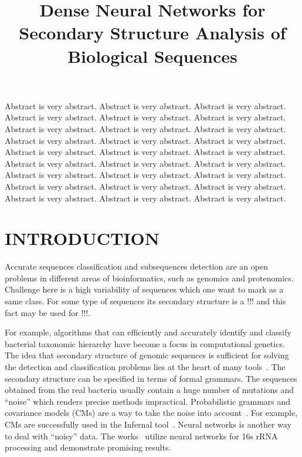 \documentclass[a4paper,twoside]{article}
\begin{document}
\title{Dense Neural Networks for Secondary Structure Analysis of Biological Sequences}

\author{
}


\abstract
{
Abstract is very abstract. Abstract is very abstract. Abstract is very abstract.
Abstract is very abstract. Abstract is very abstract. Abstract is very abstract.
Abstract is very abstract. Abstract is very abstract. Abstract is very abstract.
Abstract is very abstract. Abstract is very abstract. Abstract is very abstract.
Abstract is very abstract. Abstract is very abstract. Abstract is very abstract.
Abstract is very abstract. Abstract is very abstract. Abstract is very abstract.
Abstract is very abstract. Abstract is very abstract. Abstract is very abstract.
Abstract is very abstract. Abstract is very abstract. Abstract is very abstract.
Abstract is very abstract. Abstract is very abstract. Abstract is very abstract.
}

\onecolumn \maketitle \normalsize \vfill

\section{\uppercase{Introduction}}
\label{sec:introduction}

\noindent Accurate sequences classification and subsequences detection are an open problems in different areas of bioinformatics, such as genomics and protenomics. 
Challenge here is a high variability of sequences which one want to mark as a same class.
For some type of sequences its secondary structure is a !!! and this fact may be used for !!!.

For example, algorithms that can efficiently and accurately identify and classify bacterial taxonomic hierarchy have become a focus in computational genetics.
The idea that secondary structure of genomic sequences is sufficient for solving the detection and classification problems lies at the heart of many tools~\cite{GrammarsRNA,PCFG,meta,LWPCFG}. 
The secondary structure can be specified in terms of formal grammars. 
The sequences obtained from the real bacteria usually contain a huge number of mutations and ``noise'' which renders precise methods impractical. 
Probabilistic grammars and covariance models (CMs) are a way to take the noise into account~\cite{EddyDurbin}.
For example, CMs are successfully used in the Infernal tool~\cite{Infernal}.
Neural networks is another way to deal with ``noisy'' data. 
The works~\cite{Humidor,ANN} utilize neural networks for 16s rRNA processing and demonstrate promising results.
\end{document}
